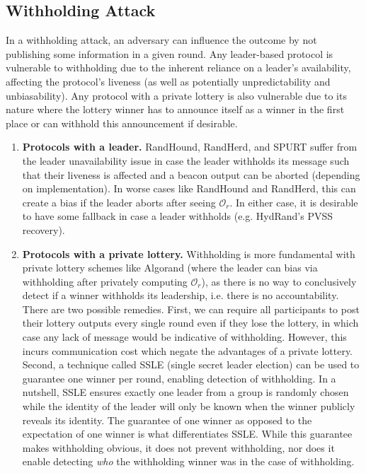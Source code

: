 \documentclass[conference]{IEEEtran}
\theoremstyle{definition}
\theoremstyle{remark}
\begin{document}
\subsection{Withholding Attack}
\label{subsection:withholding}
In a withholding attack, an adversary can influence the outcome by not publishing some information in a given round. Any leader-based protocol is vulnerable to withholding due to the inherent reliance on a leader's availability, affecting the protocol's liveness (as well as potentially unpredictability and unbiasability). Any protocol with a private lottery is also vulnerable due to its nature where the lottery winner has to announce itself as a winner in the first place or can withhold this announcement if desirable.
\begin{enumerate}
\item \textbf{Protocols with a leader.} RandHound, RandHerd, and SPURT suffer from the leader unavailability issue in case the leader withholds its message such that their liveness is affected and a beacon output can be aborted (depending on implementation). In worse cases like RandHound and RandHerd, this can create a bias if the leader aborts after seeing $\mathcal{O}_r$. In either case, it is desirable to have some fallback in case a leader withholds (e.g. HydRand's PVSS recovery).
\item \textbf{Protocols with a private lottery.} Withholding is more fundamental with private lottery schemes like Algorand (where the leader can bias via withholding after privately computing $\mathcal{O}_r$), as there is no way to conclusively detect if a winner withholds its leadership, i.e. there is no accountability. There are two possible remedies. First, we can require all participants to post their lottery outputs every single round even if they lose the lottery, in which case any lack of message would be indicative of withholding. However, this incurs communication cost which negate the advantages of a private lottery. Second, a technique called SSLE (single secret leader election) \cite{boneh2020single} can be used to guarantee one winner per round, enabling detection of withholding. In a nutshell, SSLE ensures exactly one leader from a group is randomly chosen while the identity of the leader will only be known when the winner publicly reveals its identity. The guarantee of one winner as opposed to the expectation of one winner is what differentiates SSLE. While this guarantee makes withholding obvious, it does not prevent withholding, nor does it enable detecting \emph{who} the withholding winner was in the case of withholding.
\end{enumerate}
\end{document}
